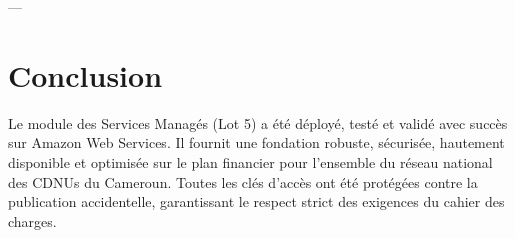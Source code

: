 \documentclass[12pt,a4paper]{article}
\begin{document}
---

\section{Conclusion}
Le module des Services Managés (Lot 5) a été déployé, testé et validé avec succès sur Amazon Web Services. Il fournit une fondation robuste, sécurisée, hautement disponible et optimisée sur le plan financier pour l'ensemble du réseau national des CDNUs du Cameroun. Toutes les clés d'accès ont été protégées contre la publication accidentelle, garantissant le respect strict des exigences du cahier des charges.
\end{document}
